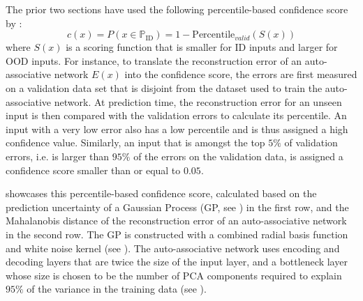 The prior two sections have used the following percentile-based confidence score by \textcite{dime-detector-2021}:
\begin{equation*}
    c(x) = P(x \in \mathbb{P}_{\text{ID}}) = 1 - \text{Percentile}_{valid}(S(x))
\end{equation*}
where $S(x)$ is a scoring function that is smaller for ID inputs and larger for OOD inputs. For instance, to translate the reconstruction error of an auto-associative network $E(x)$ into the confidence score, the errors are first measured on a validation data set that is disjoint from the dataset used to train the auto-associative network. At prediction time, the reconstruction error for an unseen input is then compared with the validation errors to calculate its percentile. An input with a very low error also has a low percentile and is thus assigned a high confidence value. Similarly, an input that is amongst the top $5\%$ of validation errors, i.e. is larger than $95\%$ of the errors on the validation data, is assigned a confidence score smaller than or equal to $0.05$.

\newpar {} showcases this percentile-based confidence score, calculated based on the prediction uncertainty of a Gaussian Process (GP, see ) in the first row, and the Mahalanobis distance of the reconstruction error of an auto-associative network in the second row. The GP is constructed with a combined radial basis function and white noise kernel (see ). The auto-associative network uses encoding and decoding layers that are twice the size of the input layer, and a bottleneck layer whose size is chosen to be the number of PCA components required to explain $95\%$ of the variance in the training data (see ).

